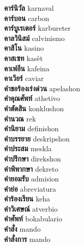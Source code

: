 \textbf{ คาร์นิวัล  } karnaval \\
\textbf{ คาร์บอน  } carbon \\
\textbf{ คาร์บูเรเตอร์  } karbureter \\
\textbf{ คาลวินิสม์  } calvinismo \\
\textbf{ คาสิโน  } kasino \\
\textbf{ คาสเซท  } kasèt \\
\textbf{ คาเฟอีน  } kafeina \\
\textbf{ คาเวียร์  } caviar \\
\textbf{ คำขอร้องเร่งด่วน  } apelashon \\
\textbf{ คำคุณศัพท์  } athetivo \\
\textbf{ คำตัดสิน  } konklushon \\
\textbf{ คำนวณ  } rek \\
\textbf{ คำนิยาม  } definishon \\
\textbf{ คำบรรยาย  } deskripshon \\
\textbf{ คำประสม  } meskla \\
\textbf{ คำปรึกษา  } direkshon \\
\textbf{ คำพิพากษา  } dekreto \\
\textbf{ คำยอมรับ  } admision \\
\textbf{ คำย่อ  } abreviatura \\
\textbf{ คำร้องเรียน  } keha \\
\textbf{ คำวิเศษณ์  } atverbio \\
\textbf{ คำศัพท์  } bokabulario \\
\textbf{ คำสั่ง  } mando \\
\textbf{ คำสั่งการ  } mando \\
